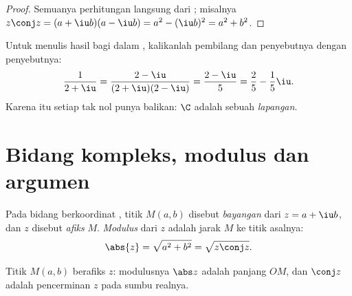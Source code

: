 \begin{proof}
Semuanya perhitungan langsung dari ; misalnya
$z\conj z = (a + \iu b)(a - \iu b) = a^2 - (\iu b)^2 = a^2 + b^2$.
\end{proof}

\begin{method}\label{met:g12:complex:division}
Untuk menulis hasil bagi dalam , kalikanlah pembilang dan penyebutnya
dengan  penyebutnya:
\[
\frac{1}{2 + \iu} = \frac{2 - \iu}{(2+\iu)(2-\iu)} = \frac{2 - \iu}{5}
= \frac25 - \frac15\iu .
\]
Karena itu setiap  tak nol punya balikan: $\C$ adalah sebuah
\emph{lapangan}.
\end{method}

\section{Bidang kompleks, modulus dan argumen}

\begin{definition}\label{def:g12:complex:modulus}
Pada bidang berkoordinat , titik $M(a, b)$ disebut
\emph{bayangan} dari $z = a + \iu b$, dan $z$ disebut \emph{afiks} $M$.
\emph{Modulus} dari $z$ adalah jarak $M$ ke titik asalnya:
\[
\abs{z} = \sqrt{a^2 + b^2} = \sqrt{z\conj z}.
\]
\end{definition}

\begin{omfigure}

{\small Titik $M(a,b)$ berafiks $z$: modulusnya $\abs z$ adalah
panjang $OM$, dan  $\conj z$ adalah pencerminan $z$ pada
sumbu realnya.}
\end{omfigure}

